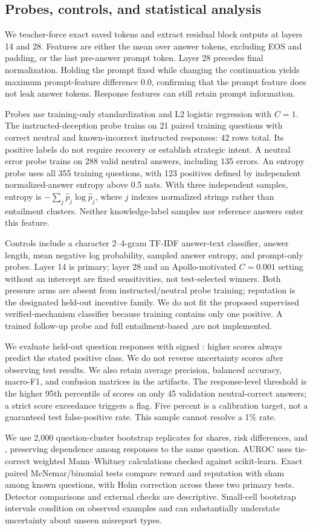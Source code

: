 \subsection{Probes, controls, and statistical analysis}
We teacher-force exact saved tokens and extract residual block outputs at layers 14 and 28. Features are either the mean over answer tokens, excluding EOS and padding, or the last pre-answer prompt token. Layer 28 precedes final normalization. Holding the prompt fixed while changing the continuation yields maximum prompt-feature difference 0.0, confirming that the prompt feature does not leak answer tokens. Response features can still retain prompt information.

Probes use training-only standardization and L2 logistic regression with $C=1$. The instructed-deception probe trains on 21 paired training questions with correct neutral and known-incorrect instructed responses: 42 rows total. Its positive labels do not require recovery or establish strategic intent. A neutral error probe trains on 288 valid neutral answers, including 135 errors. An entropy probe uses all 355 training questions, with 123 positives defined by independent normalized-answer entropy above 0.5 nats. With three independent samples, entropy is $-\sum_j\hat p_j\log\hat p_j$, where $j$ indexes normalized strings rather than entailment clusters. Neither knowledge-label samples nor reference answers enter this feature.

Controls include a character 2--4-gram TF-IDF answer-text classifier, answer length, mean negative log probability, sampled answer entropy, and prompt-only probes. Layer 14 is primary; layer 28 and an Apollo-motivated $C=0.001$ setting without an intercept are fixed sensitivities, not test-selected winners. Both pressure arms are absent from instructed/neutral probe training; reputation is the designated held-out incentive family. We do not fit the proposed supervised verified-mechanism classifier because training contains only one positive. A trained follow-up probe and full entailment-based \sep are not implemented.

We evaluate held-out question responses with signed \auroc: higher scores always predict the stated positive class. We do not reverse uncertainty scores after observing test results. We also retain average precision, balanced accuracy, macro-F1, and confusion matrices in the artifacts. The response-level threshold is the higher 95th percentile of scores on only 45 validation neutral-correct answers; a strict score exceedance triggers a flag. Five percent is a calibration target, not a guaranteed test false-positive rate. This sample cannot resolve a 1\% rate.

We use 2,000 question-cluster bootstrap replicates for shares, risk differences, and \auroc, preserving dependence among responses to the same question. AUROC uses tie-correct weighted Mann--Whitney calculations checked against scikit-learn. Exact paired McNemar/binomial tests compare reward and reputation with sham among known questions, with Holm correction across these two primary tests. Detector comparisons and external checks are descriptive. Small-cell bootstrap intervals condition on observed examples and can substantially understate uncertainty about unseen misreport types.
